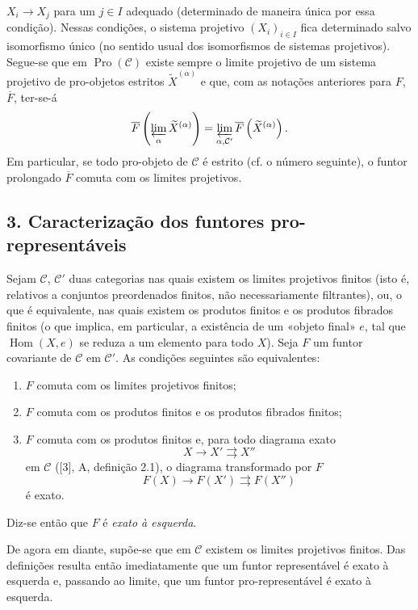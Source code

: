 $X_i\longrightarrow X_j$ para um $j\in I$ adequado (determinado de maneira
única por essa condição). Nessas condições, o sistema projetivo
$(X_i)_{i\in I}$ fica determinado salvo isomorfismo único (no sentido usual
dos isomorfismos de sistemas projetivos). Segue-se que em
$\operatorname{Pro}(\mathcal C)$ existe sempre o limite projetivo de um
sistema projetivo de pro-objetos estritos $\widetilde X^{(\alpha)}$ e que, com
as notações anteriores para $F$, $\overline F$, ter-se-á
\[
  \overline F\left(\varprojlim_\alpha\widetilde X^{(\alpha)}\right)
  =\varprojlim_{\alpha,\mathcal C'}
  \overline F\left(\widetilde X^{(\alpha)}\right).
\]
Em particular, se todo pro-objeto de $\mathcal C$ é estrito (cf. o número
seguinte), o funtor prolongado $\overline F$ comuta com os limites
projetivos.

\subsection*{3. Caracterização dos funtores pro-representáveis}

Sejam $\mathcal C$, $\mathcal C'$ duas categorias nas quais existem os limites
projetivos finitos (isto é, relativos a conjuntos preordenados finitos, não
necessariamente filtrantes), ou, o que é equivalente, nas quais existem os
produtos finitos e os produtos fibrados finitos (o que implica, em
particular, a existência de um «objeto final» $e$, tal que
$\operatorname{Hom}(X,e)$ se reduza a um elemento para todo $X$). Seja $F$ um
funtor covariante de $\mathcal C$ em $\mathcal C'$. As condições seguintes
são equivalentes:

\begin{enumerate}
\item[(i)] $F$ comuta com os limites projetivos finitos;
\item[(ii)] $F$ comuta com os produtos finitos e os produtos fibrados finitos;
\item[(iii)] $F$ comuta com os produtos finitos e, para todo diagrama exato
\[
  X\longrightarrow X'\rightrightarrows X''
\]
em $\mathcal C$ ([3], A, definição 2.1), o diagrama transformado por $F$
\[
  F(X)\longrightarrow F(X')\rightrightarrows F(X'')
\]
é exato.
\end{enumerate}

Diz-se então que $F$ é \emph{exato à esquerda}.

De agora em diante, supõe-se que em $\mathcal C$ existem os limites projetivos
finitos. Das definições resulta então imediatamente que um funtor
representável é exato à esquerda e, passando ao limite, que um funtor
pro-representável é exato à esquerda.

